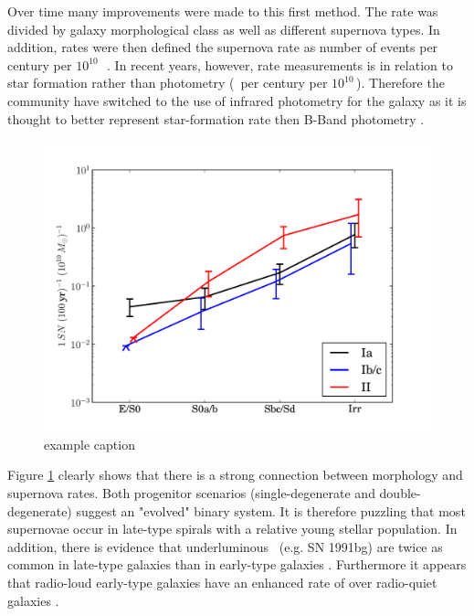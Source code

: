 Over time many improvements were made to this first method. The rate was divided by galaxy morphological class as well as different supernova types. In addition, rates were then defined the supernova rate as number of events per century per $10^{10}$\,\lsun\ \citep[e.g.][]{1991ARA&A..29..363V,1994ApJS...92..487T}. In recent years, however, rate measurements is in relation to star formation rather than photometry (\sn\ per century per $10^{10}$\,\msun).  Therefore the community \citep[e.g.][]{2005A&A...433..807M} have switched to the use of infrared photometry for the galaxy as it is thought to better represent star-formation rate then B-Band photometry \citep{2003A&A...410...83H}. 
\begin{figure}[htbp] %
   \centering
   \includegraphics[width=\textwidth]{chapter_intro/plots/snrates_mannucci05.pdf} 
   \caption{example caption}
   \label{fig:snrates_mannucci05}
\end{figure}

Figure \ref{fig:snrates_mannucci05} clearly shows that there is a strong connection between morphology and supernova rates. 
Both progenitor scenarios (single-degenerate and double-degenerate) suggest an "evolved" binary system. It is therefore puzzling that most supernovae occur in late-type spirals with a relative young stellar population. 
In addition, there is evidence that underluminous \sneia\ (e.g. SN 1991bg) are twice as common in late-type galaxies than in early-type galaxies \citep{2001ApJ...554L.193H}. 
Furthermore it appears that radio-loud early-type galaxies have an enhanced rate of \sneia over radio-quiet galaxies \citep{2003ApJ...587L..71D}. 

